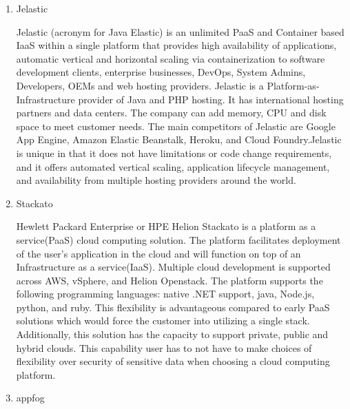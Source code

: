 \begin{enumerate}
\item {} 
Jelastic

Jelastic (acronym for Java Elastic) is an unlimited PaaS and
Container based IaaS within a single platform that provides high
availability of applications, automatic vertical and horizontal
scaling via containerization to software development clients,
enterprise businesses, DevOps, System Admins, Developers, OEMs and
web hosting providers. \label{\detokenize{i524/technologies:id186}}{\hyperref[\detokenize{i524/technologies:www-jelastic-2}]{\sphinxcrossref{{[}160{]}}}} Jelastic is a
Platform-as-Infrastructure provider of Java and PHP hosting.  It
has international hosting partners and data centers. The company
can add memory, CPU and disk space to meet customer needs. The
main competitors of Jelastic are Google App Engine, Amazon Elastic
Beanstalk, Heroku, and Cloud Foundry.Jelastic is unique in that it
does not have limitations or code change requirements, and it
offers automated vertical scaling, application lifecycle
management, and availability from multiple hosting providers
around the world. \label{\detokenize{i524/technologies:id187}}{\hyperref[\detokenize{i524/technologies:www-jelastic-1}]{\sphinxcrossref{{[}161{]}}}}

\item {} 
Stackato

Hewlett Packard Enterprise or HPE Helion Stackato is a platform as
a service(PaaS) cloud computing solution.  The platform
facilitates deployment of the user’s application in the cloud and
will function on top of an Infrastructure as a
service(IaaS). \label{\detokenize{i524/technologies:id188}}{\hyperref[\detokenize{i524/technologies:www-hpe}]{\sphinxcrossref{{[}162{]}}}} Multiple cloud development is
supported across AWS, vSphere, and Helion Openstack.  The platform
supports the following programming languages: native .NET support,
java, Node.js, python, and ruby.  This flexibility is advantageous
compared to early PaaS solutions which would force the customer
into utilizing a single stack.  Additionally, this solution has
the capacity to support private, public and hybrid clouds.
\label{\detokenize{i524/technologies:id189}}{\hyperref[\detokenize{i524/technologies:www-virt}]{\sphinxcrossref{{[}163{]}}}} This capability user has to not have to make
choices of flexibility over security of sensitive data when
choosing a cloud computing platform.

\item {} 
appfog


\end{enumerate}
